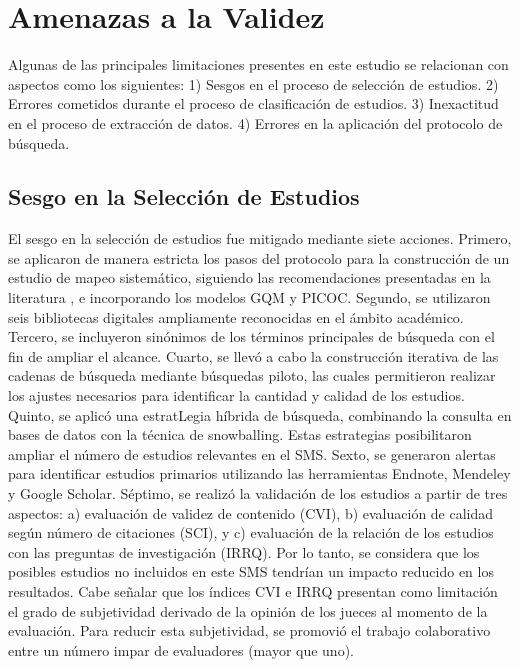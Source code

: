 \section{Amenazas a la Validez}\label{sec:amenazas-validez}
Algunas de las principales limitaciones presentes en este estudio se relacionan con aspectos como los siguientes: 1) Sesgos en el proceso de selección de estudios. 2) Errores cometidos durante el proceso de clasificación de estudios. 3) Inexactitud en el proceso de extracción de datos. 4) Errores en la aplicación del protocolo de búsqueda.


\subsection{Sesgo en la Selección de Estudios}
El sesgo en la selección de estudios fue mitigado mediante siete acciones.
Primero, se aplicaron de manera estricta los pasos del protocolo para la construcción de un estudio de mapeo sistemático, siguiendo las recomendaciones presentadas en la literatura \cite{Kitchenham2010792, budgen2008using}, e incorporando los modelos GQM y PICOC. Segundo, se utilizaron seis bibliotecas digitales ampliamente reconocidas en el ámbito académico. Tercero, se incluyeron sinónimos de los términos principales de búsqueda con el fin de ampliar el alcance. Cuarto, se llevó a cabo la construcción iterativa de las cadenas de búsqueda mediante búsquedas piloto, las cuales permitieron realizar los ajustes necesarios para identificar la cantidad y calidad de los estudios. Quinto, se aplicó una estratLegia híbrida de búsqueda, combinando la consulta en bases de datos con la técnica de snowballing. Estas estrategias posibilitaron ampliar el número de estudios relevantes en el SMS. Sexto, se generaron alertas para identificar estudios primarios utilizando las herramientas Endnote, Mendeley y Google Scholar. Séptimo, se realizó la validación de los estudios a partir de tres aspectos: a) evaluación de validez de contenido (CVI), b) evaluación de calidad según número de citaciones (SCI), y c) evaluación de la relación de los estudios con las preguntas de investigación (IRRQ). Por lo tanto, se considera que los posibles estudios no incluidos en este SMS tendrían un impacto reducido en los resultados. Cabe señalar que los índices CVI e IRRQ presentan como limitación el grado de subjetividad derivado de la opinión de los jueces al momento de la evaluación. Para reducir esta subjetividad, se promovió el trabajo colaborativo entre un número impar de evaluadores (mayor que uno).


